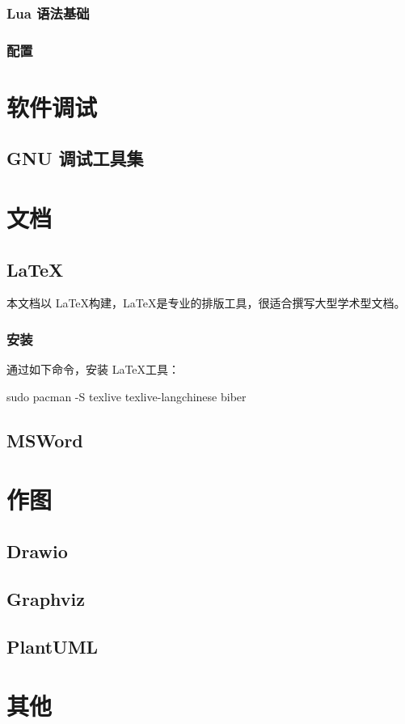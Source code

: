 \subsubsection{Lua 语法基础}

\subsubsection{配置}

\section{软件调试}
\subsection{GNU 调试工具集}

\section{文档}

\subsection{\LaTeX}

本文档以 \LaTeX 构建，\LaTeX 是专业的排版工具，很适合撰写大型学术型文档。

\subsubsection*{安装}

通过如下命令，安装 \LaTeX 工具：

\begin{lstcode}
  sudo pacman -S texlive texlive-langchinese biber
\end{lstcode}

\subsection{MSWord}

\section{作图}
\subsection{Drawio}
\subsection{Graphviz}
\subsection{PlantUML}

\section{其他}
